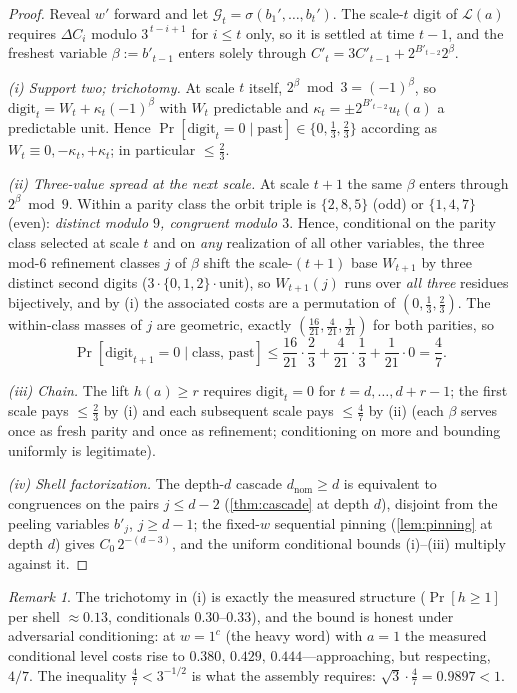 \documentclass[11pt]{article}
\theoremstyle{plain}
\theoremstyle{definition}
\theoremstyle{remark}
\newtheorem*{remark}{Remark}
\begin{document}
\begin{proof}
Reveal $w'$ forward and let $\mathcal G_t=\sigma(b_1',\dots,b_t')$. The
scale-$t$ digit of $\mathcal L(a)$ requires $\Delta C_i$ modulo
$3^{\,t-i+1}$ for $i\le t$ only, so it is settled at time $t-1$, and the
freshest variable $\beta:=b'_{t-1}$ enters solely through
$C'_t=3C'_{t-1}+2^{B'_{t-2}}2^{\beta}$.

\emph{(i) Support two; trichotomy.} At scale $t$ itself,
$2^{\beta}\bmod3=(-1)^{\beta}$, so
$\mathrm{digit}_t=W_t+\kappa_t(-1)^{\beta}$ with $W_t$ predictable and
$\kappa_t=\pm2^{B'_{t-2}}u_t(a)$ a predictable unit. Hence
$\Pr[\mathrm{digit}_t=0\mid\text{past}]\in\{0,\tfrac13,\tfrac23\}$
according as $W_t\equiv0,-\kappa_t,+\kappa_t$; in particular $\le\frac23$.

\emph{(ii) Three-value spread at the next scale.} At scale $t+1$ the same
$\beta$ enters through $2^{\beta}\bmod9$. Within a parity class the orbit
triple is $\{2,8,5\}$ (odd) or $\{1,4,7\}$ (even): \emph{distinct
modulo $9$, congruent modulo $3$}. Hence, conditional on the parity class
selected at scale $t$ and on \emph{any} realization of all other
variables, the three mod-$6$ refinement classes $j$ of $\beta$ shift the
scale-$(t{+}1)$ base $W_{t+1}$ by three distinct second digits
($3\cdot\{0,1,2\}\cdot$unit), so $W_{t+1}(j)$ runs over \emph{all three}
residues bijectively, and by (i) the associated costs are a permutation of
$(0,\tfrac13,\tfrac23)$. The within-class masses of $j$ are geometric,
exactly $(\tfrac{16}{21},\tfrac4{21},\tfrac1{21})$ for both parities, so
\[
\Pr[\mathrm{digit}_{t+1}=0\mid\text{class, past}]
\le\frac{16}{21}\cdot\frac23+\frac4{21}\cdot\frac13+\frac1{21}\cdot0
=\frac47 .
\]

\emph{(iii) Chain.} The lift $h(a)\ge r$ requires
$\mathrm{digit}_t=0$ for $t=d,\dots,d+r-1$; the first scale pays
$\le\frac23$ by (i) and each subsequent scale pays $\le\frac47$ by (ii)
(each $\beta$ serves once as fresh parity and once as refinement;
conditioning on more and bounding uniformly is legitimate). 

\emph{(iv) Shell factorization.} The depth-$d$ cascade
$d_{\mathrm{nom}}\ge d$ is equivalent to congruences on the pairs
$j\le d-2$ (\cref{thm:cascade} at depth $d$), disjoint from the peeling
variables $b'_j$, $j\ge d-1$; the fixed-$w$ sequential pinning
(\cref{lem:pinning} at depth $d$) gives $C_0\,2^{-(d-3)}$, and the
uniform conditional bounds (i)--(iii) multiply against it.
\end{proof}

\begin{remark}
The trichotomy in (i) is exactly the measured structure ($\Pr[h\ge1]$
per shell $\approx0.13$, conditionals $0.30$--$0.33$), and the bound is
honest under adversarial conditioning: at $w=1^c$ (the heavy word) with
$a=1$ the measured conditional level costs rise to
$0.380,\,0.429,\,0.444$---approaching, but respecting, $4/7$. The
inequality $\frac47<3^{-1/2}$ is what the assembly requires:
$\sqrt3\cdot\frac47=0.9897<1$.
\end{remark}
\end{document}
